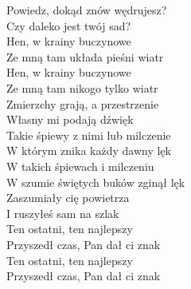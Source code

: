 
\begin{flushleft}
Powiedz, dokąd znów wędrujesz?  \\
Czy daleko jest twój sad? \tab{}\\
Hen, w krainy buczynowe \tab{} \\
Ze mną tam układa pieśni wiatr \\
\hspace{0.9cm}Hen, w krainy buczynowe \tab{}\\
\hspace{0.9cm}Ze mną tam nikogo tylko wiatr \\
\vskip 3mm
Zmierzchy grają, a przestrzenie \\
Własny mi podają dźwięk \\
Takie śpiewy z nimi lub milczenie \\
W którym znika każdy dawny lęk \\
\hspace{0.9cm}W takich śpiewach i milczeniu \\
\hspace{0.9cm}W szumie świętych buków zginął lęk \\
\vskip 3mm
Zaszumiały cię powietrza \\
I ruszyłeś sam na szlak \\
Ten ostatni, ten najlepszy \\
Przyszedł czas, Pan dał ci znak \\
\hspace{0.9cm}Ten ostatni, ten najlepszy \\
\hspace{0.9cm}Przyszedł czas, Pan dał ci znak \\
\end{flushleft}
\clearpage
